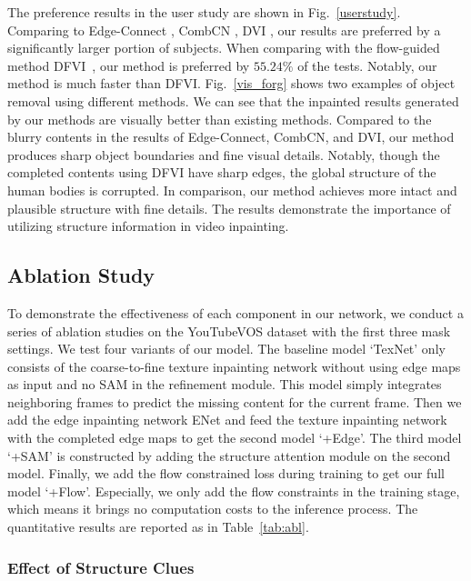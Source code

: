 The preference results in the user study are shown in Fig.~\ref{userstudy}. 
Comparing to Edge-Connect \cite{nazeri2019edgeconnect}, CombCN \cite{wang2019video}, DVI \cite{Kim_2019_CVPR1}, our results are preferred by a significantly larger portion of subjects.
%
When comparing with the flow-guided method DFVI~\cite{Xu_2019_CVPR}, our method is preferred by $55.24\%$ of the tests. 
Notably, our method is much faster than DFVI.
%
Fig.~\ref{vis_forg} shows two examples of object removal using different methods. 
We can see that the inpainted results generated by our methods are visually better than existing methods.
Compared to the blurry contents in the results of Edge-Connect, CombCN, and DVI, our method produces sharp object boundaries and fine visual details. Notably, though the completed contents using DFVI have sharp edges, the global structure of the human bodies is corrupted. In comparison, our method achieves more intact and plausible structure with fine details.
The results demonstrate the importance of utilizing structure information in video inpainting. 




\subsection{Ablation Study}
To demonstrate the effectiveness of each component in our network, we conduct a series of ablation studies on the YouTubeVOS dataset with the first three mask settings. 
%
We test four variants of our model. 
The baseline model `TexNet' only consists of the coarse-to-fine texture inpainting network without using edge maps as input and no SAM in the refinement module.
This model simply integrates neighboring frames to predict the missing content for the current frame.
%
Then we add the edge inpainting network ENet and feed the texture inpainting network with the completed edge maps to get the second model `+Edge'.
The third model `+SAM' is constructed by adding the structure attention module on the second model. 
Finally, we add the flow constrained loss during training to get our full model `+Flow'. Especially, we only add the flow constraints in the training stage, which means it brings no computation costs to the inference process.
The quantitative results are reported as in Table~\ref{tab:abl}. 

%

\subsubsection{Effect of Structure Clues}


